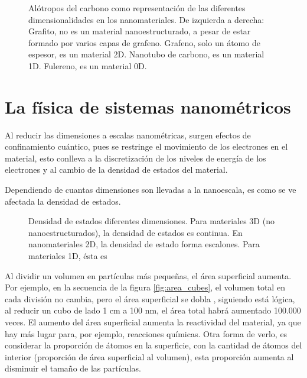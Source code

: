 \begin{figure}
	\centering
	\caption[Alótropos del carbono mostrando las diferentes dimensionalidades de los nanomateriales]{Alótropos del carbono como representación de las diferentes dimensionalidades en los nanomateriales. De izquierda a derecha: Grafito, no es un material nanoestructurado, a pesar de estar formado por varios capas de grafeno. Grafeno, solo un átomo de espesor, es un material 2D. Nanotubo de carbono, es un material 1D. Fulereno, es un material 0D.}
	\label{fig:carbon_allotropes}
\end{figure}

\section*{La física de sistemas nanométricos}


Al reducir las dimensiones a escalas nanométricas, surgen efectos de confinamiento cuántico, pues se restringe el movimiento de los electrones en el material, esto conlleva a la discretización de los niveles de energía de los electrones y al cambio de la densidad de estados del material. 


Dependiendo de cuantas dimensiones son llevadas a la nanoescala, es como se ve afectada la densidad de estados.

\begin{figure}[h!]
	\centering
	\caption[Densidad de estados en diferentes dimensionalidades]{Densidad de estados diferentes dimensiones. Para materiales 3D (no nanoestructurados), la densidad de estados es continua. En nanomateriales 2D, la densidad de estado forma escalones. Para materiales 1D, ésta es}
	\label{fig:DoE}
\end{figure}

Al dividir un volumen en partículas más pequeñas, el área superficial aumenta. Por ejemplo, en la secuencia de la figura \ref{fig:area_cubes}, el volumen total en cada división no cambia, pero el área superficial se dobla \footnotemark, siguiendo está lógica, al reducir un cubo de lado 1 cm a 100 nm, el área total habrá aumentado 100.000 veces. El aumento del área superficial aumenta la reactividad del material, ya que hay más lugar para, por ejemplo, reacciones químicas. Otra forma de verlo, es considerar la proporción de átomos en la superficie, con la cantidad de átomos del interior (proporción de área superficial al volumen), esta proporción aumenta al disminuir el tamaño de las partículas.


